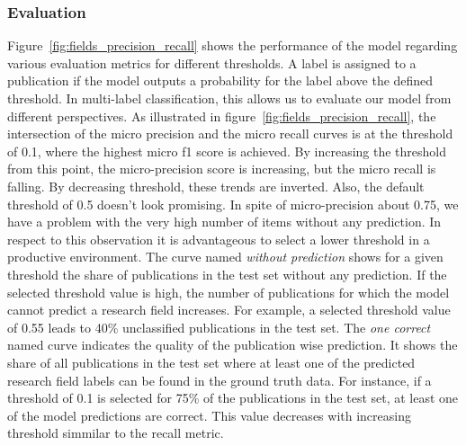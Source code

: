 \subsubsection{Evaluation}
Figure~\ref{fig:fields_precision_recall} shows the performance of the model regarding various evaluation metrics for different thresholds.
A label is assigned to a publication if the model outputs a probability for the label above the defined threshold.
In multi-label classification, this allows us to evaluate our model from different perspectives. 
As illustrated in figure~\ref{fig:fields_precision_recall}, the intersection of the micro precision and the micro recall curves is at the threshold of 0.1, where the highest micro f1 score is achieved.
By increasing the threshold from this point, the micro-precision score is increasing, but the micro recall is falling.
By decreasing threshold, these trends are inverted.
Also, the default threshold of 0.5 doesn't look promising.
In spite of micro-precision about 0.75, we have a problem with the very high number of items without any prediction. 
In respect to this observation it is advantageous to select a lower threshold in a productive environment.
The curve named \emph{without prediction} shows for a given threshold the share of publications in the test set without any prediction.
If the selected threshold value is high, the number of publications for which the model cannot predict a research field increases.
For example, a selected threshold value of 0.55 leads to 40\% unclassified publications in the test set.
The \emph{one correct} named curve indicates the quality of the publication wise prediction.
It shows the share of all publications in the test set where at least one of the predicted research field labels can be found in the ground truth data.
For instance, if a threshold of 0.1 is selected for 75\% of the publications in the test set, at least one of the model predictions are correct.
This value decreases with increasing threshold simmilar to the recall metric.





